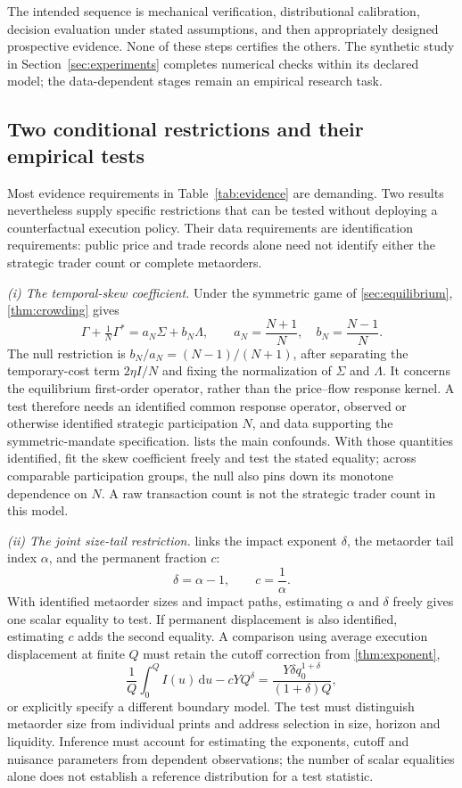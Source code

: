 \documentclass[11pt]{article}
\numberwithin{equation}{section}
\theoremstyle{definition}
\theoremstyle{remark}
\theoremstyle{definition}
\newcommand{\dd}{\,\mathrm d}
\begin{document}
The intended sequence is mechanical verification, distributional calibration,
decision evaluation under stated assumptions, and then appropriately designed
prospective evidence. None of these steps certifies the others. The synthetic
study in Section~\ref{sec:experiments} completes numerical checks within its
declared model; the data-dependent stages remain an empirical research task.

\subsection{Two conditional restrictions and their empirical tests}
\label{sec:testable}

Most evidence requirements in Table~\ref{tab:evidence} are demanding.
Two results nevertheless supply specific restrictions that can be tested
without deploying a counterfactual execution policy. Their data requirements
are identification requirements: public price and trade records alone need
not identify either the strategic trader count or complete metaorders.

\emph{(i) The temporal-skew coefficient.} Under the symmetric game of
\cref{sec:equilibrium}, \cref{thm:crowding} gives
\[
 \Gamma+\tfrac1N\Gamma^*
 =a_N\Sigma+b_N\Lambda,\qquad
 a_N=\frac{N+1}{N},\quad b_N=\frac{N-1}{N}.
\]
The null restriction is $b_N/a_N=(N-1)/(N+1)$, after separating the
temporary-cost term $2\eta I/N$ and fixing the normalization of $\Sigma$
and $\Lambda$. It concerns the equilibrium first-order operator, rather
than the price--flow response kernel. A test therefore needs an identified
common response operator, observed or otherwise identified strategic
participation $N$, and data supporting the symmetric-mandate specification.
 lists the main confounds. With those quantities
identified, fit the skew coefficient freely and test the stated equality;
across comparable participation groups, the null also pins down its monotone
dependence on $N$. A raw transaction count is not the strategic trader count
in this model.

\emph{(ii) The joint size-tail restriction.}  links the
impact exponent $\delta$, the metaorder tail index $\alpha$, and the
permanent fraction $c$:
\[
 \delta=\alpha-1,\qquad c=\frac1\alpha.
\]
With identified metaorder sizes and impact paths, estimating $\alpha$ and
$\delta$ freely gives one scalar equality to test. If permanent displacement
is also identified, estimating $c$ adds the second equality.
A comparison using average execution displacement at finite $Q$ must retain
the cutoff correction from \cref{thm:exponent},
\[
 \frac1Q\int_0^Q I(u)\dd u-cYQ^\delta
 =\frac{Y\delta q_0^{1+\delta}}{(1+\delta)Q},
\]
or explicitly specify a different boundary model. The test must distinguish
metaorder size from individual prints and address selection in size, horizon
and liquidity. Inference must account for estimating the exponents, cutoff
and nuisance parameters from dependent observations; the number of scalar
equalities alone does not establish a reference distribution for a test
statistic.
\end{document}
